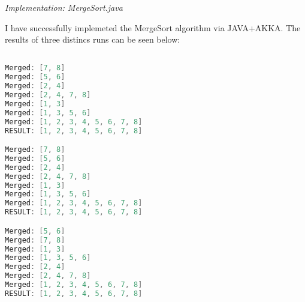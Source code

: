 \documentclass[format=acmsmall, review=false, screen=true]{acmart}
\begin{document}
\textit{Implementation: MergeSort.java}

I have successfully implemeted the MergeSort algorithm via JAVA+AKKA. The results of three distincs runs can be seen below:

\begin{lstlisting}[language=java]

Merged: [7, 8]
Merged: [5, 6]
Merged: [2, 4]
Merged: [2, 4, 7, 8]
Merged: [1, 3]
Merged: [1, 3, 5, 6]
Merged: [1, 2, 3, 4, 5, 6, 7, 8]
RESULT: [1, 2, 3, 4, 5, 6, 7, 8]

Merged: [7, 8]
Merged: [5, 6]
Merged: [2, 4]
Merged: [2, 4, 7, 8]
Merged: [1, 3]
Merged: [1, 3, 5, 6]
Merged: [1, 2, 3, 4, 5, 6, 7, 8]
RESULT: [1, 2, 3, 4, 5, 6, 7, 8]

Merged: [5, 6]
Merged: [7, 8]
Merged: [1, 3]
Merged: [1, 3, 5, 6]
Merged: [2, 4]
Merged: [2, 4, 7, 8]
Merged: [1, 2, 3, 4, 5, 6, 7, 8]
RESULT: [1, 2, 3, 4, 5, 6, 7, 8]

\end{lstlisting}
\end{document}
